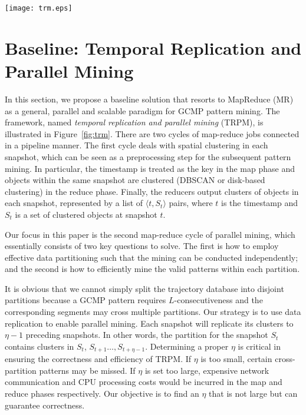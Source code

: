 


\begin{figure*} [t]
\center
\texttt{[image: trm.eps]}
\caption{Work flow of Temporal Replication and Mining. (a)(b) correspond to the first map-reduce cycle which clusters objects in each snapshot;  (c)(d) correspond to the second map-reduce cycle which uses temporal replication to mine GCMP in parallel.}
\label{fig:trm}
\end{figure*}

\section{Baseline: Temporal Replication and Parallel Mining}
\label{sec:trm}
In this section, we propose a baseline solution that resorts to MapReduce (MR) as a general, parallel and scalable paradigm for GCMP pattern mining. The framework, named \textit{temporal replication and parallel mining} (TRPM), is illustrated in   Figure~\ref{fig:trm}. There are two cycles of map-reduce jobs connected in a pipeline manner. The first cycle deals with spatial clustering in each snapshot, which can be seen as a preprocessing step for the subsequent pattern mining. In particular, the timestamp is treated as the key in the map phase and objects within the same snapshot are clustered (DBSCAN or disk-based clustering) in the reduce phase. Finally, the reducers output clusters of objects in each snapshot, represented by a list of $\langle t,S_t \rangle$ pairs, where $t$ is the timestamp and $S_t$ is a set of clustered objects at snapshot $t$. 

Our focus in this paper is the second map-reduce cycle of parallel mining, which essentially consists of two key questions to solve. The first is how to employ effective data partitioning such that the mining can be conducted independently; and the second is how to efficiently mine the valid patterns within each partition. 


It is obvious that we cannot simply split the trajectory database 
into disjoint partitions because a GCMP pattern requires $L$-consecutiveness 
and the corresponding segments may cross multiple partitions. 
Our strategy is to use data replication to enable parallel mining. 
Each snapshot will replicate its clusters to $\eta-1$ preceding snapshots.
In other words, the partition for the snapshot $S_t$ contains clusters 
in $S_t$, $S_{t+1}\ldots,S_{t+\eta-1}$. 
Determining a proper $\eta$ is critical in ensuring the
correctness and efficiency of TRPM. If $\eta$ is too small, 
certain cross-partition patterns may be missed. 
If $\eta$ is set too large, expensive network communication and 
CPU processing costs would be incurred in the map and reduce phases respectively. Our objective is to find an $\eta$ that is not large but can guarantee correctness.



